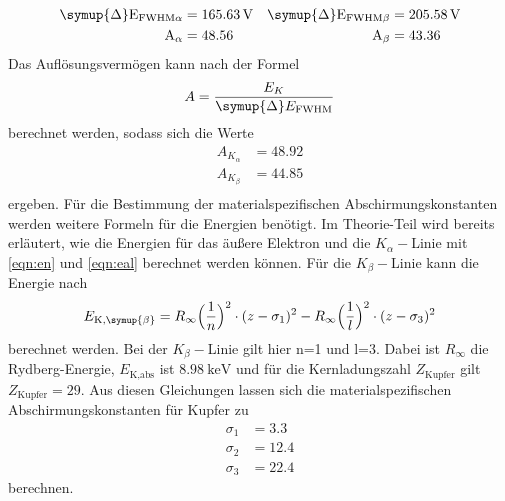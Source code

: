  
\begin{align}
  \symup{\Delta}\text{E}_{\text{FWHM}\alpha}&=165.63 \, \mathrm{V}   &\symup{\Delta}\text{E}_{\text{FWHM}\beta}&=205.58 \, \mathrm{V} \\
  \text{A}_\alpha&=48.56  &\text{A}_\beta&=43.36 \\
  \end{align}
\noindent 
Das Auflösungsvermögen kann nach der Formel
\begin{equation*}
    A = \frac{E_K}{\symup{\Delta}E_{\text{FWHM}}}
\end{equation*}
berechnet werden, sodass sich die Werte
\begin{align*}
    A_{K_\alpha} &= \num{48.92} \\
    A_{K_\beta}  &= \num{44.85} \\
\end{align*}
ergeben. \newline
Für die Bestimmung der materialspezifischen Abschirmungskonstanten werden weitere Formeln für die Energien benötigt.
Im Theorie-Teil wird bereits erläutert, wie die Energien für das äußere Elektron und die $K_\alpha-$Linie mit \autoref{eqn:en} und \autoref{eqn:eal} berechnet werden können. Für die $K_\beta-$Linie kann die Energie nach
\begin{equation}
\label{eqn:ebeta}
E_{\text{K},\symup{\beta}} = R_\infty \Bigl(\frac{1}{n}\Bigr)^2 \cdot (z - \sigma_1)^2 - R_\infty \Bigl(\frac{1}{l}\Bigr)^2 \cdot (z - \sigma_3)^2
\end{equation}
berechnet werden. Bei der $K_\beta-$Linie gilt hier n=1 und l=3. 
Dabei ist $R_\infty$ die Rydberg-Energie, $E_\text{K,abs}$ ist $\SI{8.98}{\kilo\electronvolt}$\cite{wissen} und für die Kernladungszahl $Z_\text{Kupfer}$ gilt $Z_\text{Kupfer} = 29$. Aus diesen Gleichungen lassen sich die materialspezifischen Abschirmungskonstanten für Kupfer zu 
\begin{align*}
  \sigma_1 &= 3.3 \\
  \sigma_2 &= 12.4\\
  \sigma_3 &= 22.4
\end{align*}
berechnen.

